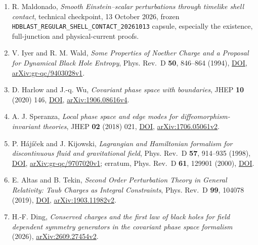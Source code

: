 \documentclass[
  10pt,
]{article}
\providecommand{\tightlist}{%
  \setlength{\itemsep}{0pt}\setlength{\parskip}{0pt}}
\begin{document}
\begin{enumerate}
\def\labelenumi{\arabic{enumi}.}
\tightlist
\item
  R. Maldonado, \emph{Smooth Einstein--scalar perturbations through
  timelike shell contact}, technical checkpoint, 13 October 2026, frozen
  \texttt{HDBLAST\_REGULAR\_SHELL\_CONTACT\_20261013} capsule,
  especially the existence, full-junction and physical-current proofs.
\item
  V. Iyer and R. M. Wald, \emph{Some Properties of Noether Charge and a
  Proposal for Dynamical Black Hole Entropy}, Phys. Rev.~D \textbf{50},
  846--864 (1994), \href{https://doi.org/10.1103/PhysRevD.50.846}{DOI},
  \href{https://arxiv.org/abs/gr-qc/9403028v1}{arXiv:gr-qc/9403028v1}.
\item
  D. Harlow and J.-q. Wu, \emph{Covariant phase space with boundaries},
  JHEP \textbf{10} (2020) 146,
  \href{https://doi.org/10.1007/JHEP10(2020)146}{DOI},
  \href{https://arxiv.org/abs/1906.08616v4}{arXiv:1906.08616v4}.
\item
  A. J. Speranza, \emph{Local phase space and edge modes for
  diffeomorphism-invariant theories}, JHEP \textbf{02} (2018) 021,
  \href{https://doi.org/10.1007/JHEP02(2018)021}{DOI},
  \href{https://arxiv.org/abs/1706.05061v2}{arXiv:1706.05061v2}.
\item
  P. Hájíček and J. Kijowski, \emph{Lagrangian and Hamiltonian formalism
  for discontinuous fluid and gravitational field}, Phys. Rev.~D
  \textbf{57}, 914--935 (1998),
  \href{https://doi.org/10.1103/PhysRevD.57.914}{DOI},
  \href{https://arxiv.org/abs/gr-qc/9707020v1}{arXiv:gr-qc/9707020v1};
  erratum, Phys. Rev.~D \textbf{61}, 129901 (2000),
  \href{https://doi.org/10.1103/PhysRevD.61.129901}{DOI}.
\item
  E. Altas and B. Tekin, \emph{Second Order Perturbation Theory in
  General Relativity: Taub Charges as Integral Constraints}, Phys.
  Rev.~D \textbf{99}, 104078 (2019),
  \href{https://doi.org/10.1103/PhysRevD.99.104078}{DOI},
  \href{https://arxiv.org/abs/1903.11982v2}{arXiv:1903.11982v2}.
\item
  H.-F. Ding, \emph{Conserved charges and the first law of black holes
  for field dependent symmetry generators in the covariant phase space
  formalism} (2026),
  \href{https://arxiv.org/abs/2609.27454v2}{arXiv:2609.27454v2}.
\end{enumerate}
\end{document}
